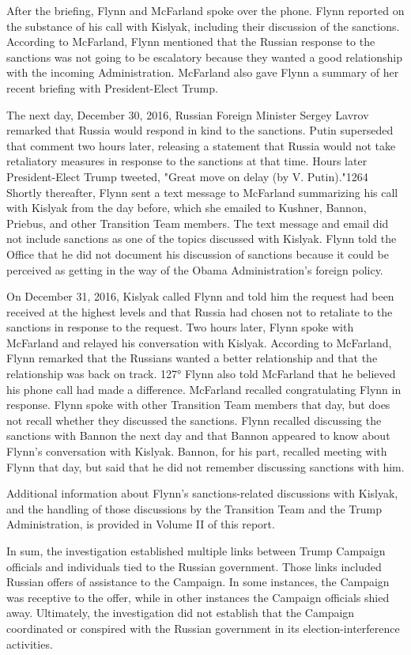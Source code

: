 After the briefing, Flynn and McFarland spoke over the phone.%
Flynn reported on the substance of his call with Kislyak, including their discussion of the sanctions.%
According to McFarland, Flynn mentioned that the Russian response to the sanctions was not going to be escalatory because they wanted a good relationship with the incoming Administration.%
McFarland also gave Flynn a summary of her recent briefing with President-Elect Trump.%

The next day, December 30, 2016, Russian Foreign Minister Sergey Lavrov remarked that Russia would respond in kind to the sanctions.%
Putin superseded that comment two hours later, releasing a statement that Russia would not take retaliatory measures in response to the sanctions at that time.%
Hours later President-Elect Trump tweeted, "Great move on delay (by V. Putin)."1264 Shortly thereafter, Flynn sent a text message to McFarland summarizing his call with Kislyak from the day before, which she emailed to Kushner, Bannon, Priebus, and other Transition Team members.%
The text message and email did not include sanctions as one of the topics discussed with Kislyak.%
Flynn told the Office that he did not document his discussion of sanctions because it could be perceived as getting in the way of the Obama Administration's foreign policy.%

On December 31, 2016, Kislyak called Flynn and told him the request had been received at the highest levels and that Russia had chosen not to retaliate to the sanctions in response to the request.%
Two hours later, Flynn spoke with McFarland and relayed his conversation with Kislyak.%
According to McFarland, Flynn remarked that the Russians wanted a better relationship and that the relationship was back on track. 127° Flynn also told McFarland that he believed his phone call had made a difference.%
McFarland recalled congratulating Flynn in response.%
Flynn spoke with other Transition Team members that day, but does not recall whether they discussed the sanctions.%
Flynn recalled discussing the sanctions with Bannon the next day and that Bannon appeared to know about Flynn's conversation with Kislyak.%
Bannon, for his part, recalled meeting with Flynn that day, but said that he did not remember discussing sanctions with him.%

Additional information about Flynn's sanctions-related discussions with Kislyak, and the handling of those discussions by the Transition Team and the Trump Administration, is provided in Volume II of this report.

\hr

In sum, the investigation established multiple links between Trump Campaign officials and individuals tied to the Russian government. Those links included Russian offers of assistance to the Campaign. In some instances, the Campaign was receptive to the offer, while in other instances the Campaign officials shied away. Ultimately, the investigation did not establish that the Campaign coordinated or conspired with the Russian government in its election-interference activities.

